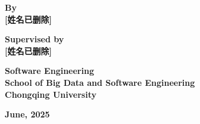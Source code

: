 \begin{center}
\textbf{By}\\
\textbf{[姓名已删除]}
\end{center}

\begin{center}
\textbf{Supervised by}\\
\textbf{[姓名已删除]}
\end{center}

\begin{center}
\textbf{Software Engineering}\\
\textbf{School of Big Data and Software Engineering}\\
\textbf{Chongqing University}
\end{center}

\begin{center}
\textbf{June, 2025}
\end{center}
\newpage
\null
\thispagestyle{empty}
\newpage
